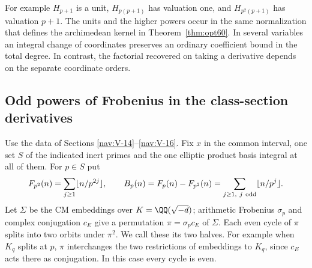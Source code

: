 \documentclass[a4paper,11pt]{article}
\theoremstyle{definition}
\theoremstyle{remark}
\numberwithin{equation}{section}
\begin{document}
For example \(H_{p+1}\) is a unit, \(H_{p(p+1)}\) has valuation
one, and \(H_{p^2(p+1)}\) has valuation \(p+1\). The units and
the higher powers occur in the same normalization that defines the
archimedean kernel in Theorem~\ref{thm:opt60}. In several variables
an integral change of coordinates preserves an ordinary coefficient
bound in the total degree. In contrast, the factorial recovered on
taking a derivative depends on the separate coordinate orders.

\subsection{Odd powers of Frobenius in the class-section derivatives}\label{nav:V-25}
Use the data of Sections \ref{nav:V-14}--\ref{nav:V-16}. Fix \(x\) in the common interval, one set \(S\)
of the indicated inert primes and the one elliptic product basis
integral at all of them. For \(p\in S\) put
\[
 F_{p^2}(n)=\sum_{j\ge1}\lfloor n/p^{2j}\rfloor,\qquad
 B_p(n)=F_p(n)-F_{p^2}(n)=\sum_{j\ge1,\ j\ {\rm odd}}
                                           \lfloor n/p^j\rfloor .
\]
Let \(\Sigma\) be the CM embeddings over \(K=\QQ(\sqrt{-d})\);
arithmetic Frobenius \(\sigma_p\) and complex conjugation \(c_E\)
give a permutation \(\pi=\sigma_p c_E\) of \(\Sigma\). Each
even cycle of \(\pi\) splits into two orbits under \(\pi^2\).
We call these its two halves. For example when \(K_q\) splits at
\(p\), \(\pi\) interchanges the two restrictions of embeddings
to \(K_q\), since \(c_E\) acts there as conjugation. In this case
every cycle is even.
\end{document}
